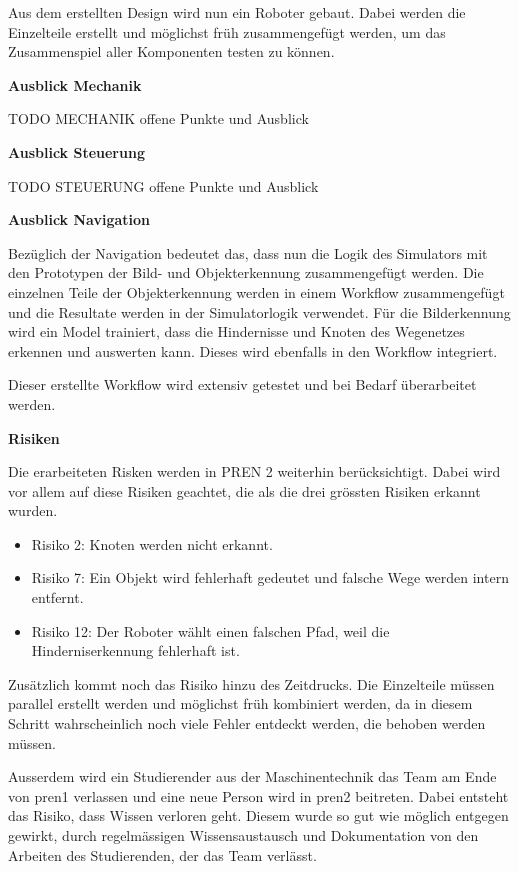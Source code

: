 Aus dem erstellten Design wird nun ein Roboter gebaut. Dabei werden die Einzelteile erstellt und möglichst früh zusammengefügt werden, um das Zusammenspiel aller Komponenten testen zu können.

\textbf{Ausblick Mechanik}

TODO MECHANIK offene Punkte und Ausblick

\textbf{Ausblick Steuerung}

TODO STEUERUNG offene Punkte und Ausblick

\textbf{Ausblick Navigation}

Bezüglich der Navigation bedeutet das, dass nun die Logik des Simulators mit den Prototypen der Bild- und Objekterkennung zusammengefügt werden. Die einzelnen Teile der Objekterkennung werden in einem Workflow zusammengefügt und die Resultate werden in der Simulatorlogik verwendet. Für die Bilderkennung wird ein Model trainiert, dass die Hindernisse und Knoten des Wegenetzes erkennen und auswerten kann. Dieses wird ebenfalls in den Workflow integriert.

Dieser erstellte Workflow wird extensiv getestet und bei Bedarf überarbeitet werden.

\textbf{Risiken}

Die erarbeiteten Risken werden in PREN 2 weiterhin berücksichtigt. Dabei wird vor allem auf diese Risiken geachtet, die als die drei grössten Risiken erkannt wurden.

\begin{itemize}
    \item Risiko 2: Knoten werden nicht erkannt.
    \item Risiko 7: Ein Objekt wird fehlerhaft gedeutet und falsche Wege werden intern entfernt.
    \item Risiko 12: Der Roboter wählt einen falschen Pfad, weil die Hinderniserkennung fehlerhaft ist.
\end{itemize}

Zusätzlich kommt noch das Risiko hinzu des Zeitdrucks. Die Einzelteile müssen parallel erstellt werden und möglichst früh kombiniert werden, da in diesem Schritt wahrscheinlich noch viele Fehler entdeckt werden, die behoben werden müssen. 

Ausserdem wird ein Studierender aus der Maschinentechnik das Team am Ende von \acrshort{pren1} verlassen und eine neue Person wird in \acrshort{pren2} beitreten. Dabei entsteht das Risiko, dass Wissen verloren geht. Diesem wurde so gut wie möglich entgegen gewirkt, durch regelmässigen Wissensaustausch und Dokumentation von den Arbeiten des Studierenden, der das Team verlässt.


